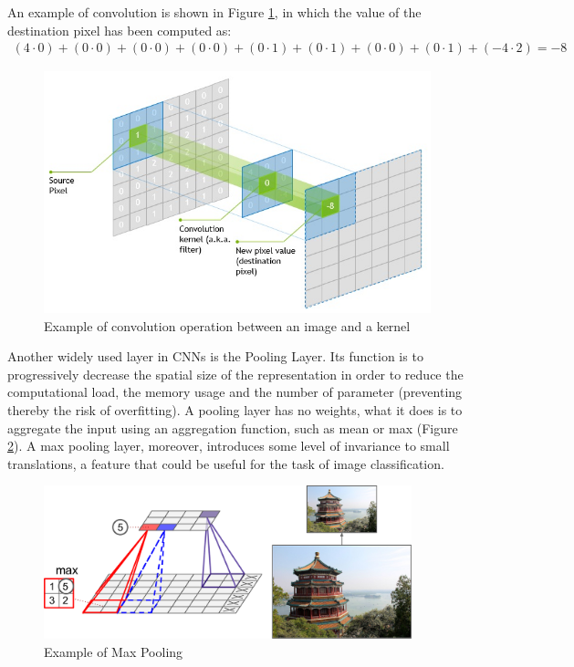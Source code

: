 \noindent An example of convolution is shown in Figure \ref{fig:sixth_figure}, in which the value of the destination pixel has been computed as: 
\begin{equation} \label{eq:second_equation}
\begin{gathered}
(4 \cdot  0) + (0 \cdot  0) + (0 \cdot  0) + (0 \cdot  0) + (0 \cdot  1) + (0 \cdot  1) + (0 \cdot  0) + (0 \cdot  1) + (-4 \cdot  2) = -8
\end{gathered}
\end{equation}

\begin{figure}[htbp!]
\centering
\includegraphics[scale=0.7]{Tesi/images/convolution}
\caption{Example of convolution operation between an image and a kernel}
\label{fig:sixth_figure}
\end{figure}

\newpage

\vspace{5mm} %
\noindent Another widely used layer in \acp{CNN} is the Pooling Layer. Its function is to progressively decrease the spatial size of the representation in order to reduce the computational load, the memory usage and the number of parameter (preventing thereby the risk of overfitting). A pooling layer has no weights, what it does is to aggregate the input using an aggregation function, such as mean or max (Figure \ref{fig:seventh_figure}). A max pooling layer, moreover, introduces some level of invariance to small translations, a feature that could be useful for the task of image classification.


\begin{figure}[htbp!]
\centering
\includegraphics[width=0.95\textwidth]{Tesi/images/pooling}
\caption{Example of Max Pooling}
\label{fig:seventh_figure}
\end{figure}

